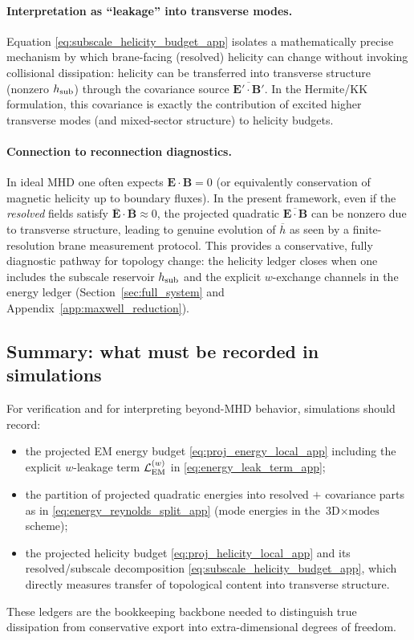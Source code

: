 \documentclass[11pt]{article}
\begin{document}
\paragraph{Interpretation as ``leakage'' into transverse modes.}
Equation \eqref{eq:subscale_helicity_budget_app} isolates a mathematically precise mechanism by
which brane-facing (resolved) helicity can change without invoking collisional dissipation:
helicity can be transferred into transverse structure (nonzero \(h_{\rm sub}\)) through the
covariance source \(\overline{\mathbf{E}'\cdot\mathbf{B}'}\). In the Hermite/KK formulation,
this covariance is exactly the contribution of excited higher transverse modes (and mixed-sector
structure) to helicity budgets.

\paragraph{Connection to reconnection diagnostics.}
In ideal MHD one often expects \(\mathbf{E}\cdot\mathbf{B}=0\) (or equivalently conservation of
magnetic helicity up to boundary fluxes). In the present framework, even if the \emph{resolved}
fields satisfy \(\overline{\mathbf{E}}\cdot\overline{\mathbf{B}}\approx 0\), the projected
quadratic \(\overline{\mathbf{E}\cdot\mathbf{B}}\) can be nonzero due to transverse structure,
leading to genuine evolution of \(\overline{h}\) as seen by a finite-resolution brane
measurement protocol. This provides a conservative, fully diagnostic pathway for topology change:
the helicity ledger closes when one includes the subscale reservoir \(h_{\rm sub}\) and the
explicit \(w\)-exchange channels in the energy ledger (Section~\ref{sec:full_system} and
Appendix~\ref{app:maxwell_reduction}).

\subsection{Summary: what must be recorded in simulations}
\label{app:budgets_summary}

For verification and for interpreting beyond-MHD behavior, simulations should record:
\begin{itemize}[leftmargin=1.7em]
\item the projected EM energy budget \eqref{eq:proj_energy_local_app} including the explicit
\(w\)-leakage term \(\mathcal{L}_{\rm EM}^{(w)}\) in \eqref{eq:energy_leak_term_app};
\item the partition of projected quadratic energies into resolved \(+\) covariance parts as in
\eqref{eq:energy_reynolds_split_app} (mode energies in the \(\text{3D}\times\text{modes}\) scheme);
\item the projected helicity budget \eqref{eq:proj_helicity_local_app} and its resolved/subscale
decomposition \eqref{eq:subscale_helicity_budget_app}, which directly measures transfer of
topological content into transverse structure.
\end{itemize}
These ledgers are the bookkeeping backbone needed to distinguish true dissipation from conservative
export into extra-dimensional degrees of freedom.
\end{document}
